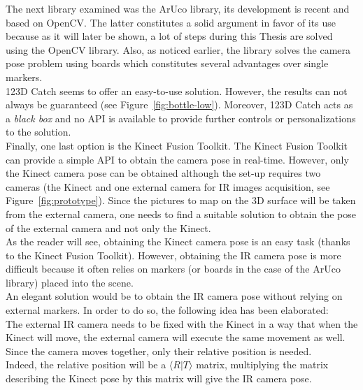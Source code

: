 The next library examined was the ArUco library, its development is recent and based on OpenCV. The latter constitutes a solid argument in favor of its use because as it will later be shown, a lot of steps during this Thesis are solved using the OpenCV library. Also, as noticed earlier, the library solves the camera pose problem using boards which constitutes several advantages over single markers.\\

123D Catch seems to offer an easy-to-use solution. However, the results can not always be guaranteed (see Figure~\ref{fig:bottle-low}). Moreover, 123D Catch acts as a \textit{black box} and no API is available to provide further controls or personalizations to the solution.\\

Finally, one last option is the Kinect Fusion Toolkit. The Kinect Fusion Toolkit can provide a simple API to obtain the camera pose in real-time. However, only the Kinect camera pose can be obtained although the set-up requires two cameras (the Kinect and one external camera for IR images acquisition, see Figure~\ref{fig:prototype}). Since the pictures to map on the 3D surface will be taken from the external camera, one needs to find a suitable solution to obtain the pose of the external camera and not only the Kinect.\\

As the reader will see, obtaining the Kinect camera pose is an easy task (thanks to the Kinect Fusion Toolkit). However, obtaining the IR camera pose is more difficult because it often relies on markers (or boards in the case of the ArUco library) placed into the scene. \\

An elegant solution would be to obtain the IR camera pose without relying on external markers. In order to do so, the following idea has been elaborated:\\

The external IR camera needs to be fixed with the Kinect in a way that when the Kinect will move, the external camera will execute the same movement as well. Since the camera moves together, only their relative position is needed.\\ 

Indeed, the relative position will be a $\langle R\vert T\rangle$ matrix, multiplying the matrix describing the Kinect pose by this matrix will give the IR camera pose.\\

